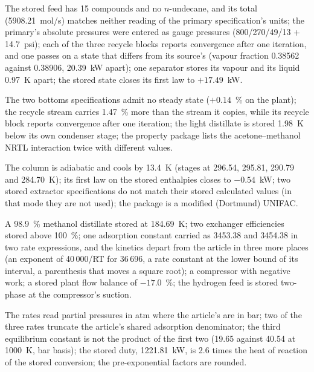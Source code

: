 \documentclass[11pt]{article}
\begin{document}
\begin{description}[leftmargin=1em]
\item[A (Cavett's problem)] The stored feed has 15 compounds and no
  $n$-undecane, and its total (5908.21~mol/s) matches neither reading of the
  primary specification's units; the primary's absolute pressures were
  entered as gauge pressures (800/270/49/13 + 14.7~psi); each of the three
  recycle blocks reports convergence after one iteration, and one passes on
  a state that differs from its source's (vapour fraction 0.38562 against
  0.38906, 20.39~kW apart); one separator stores its vapour and its liquid
  0.97~K apart; the stored state closes its first law to $+17.49$~kW.
\item[B (pressure-swing distillation)] The two bottoms specifications admit
  no steady state ($+0.14$~\% on the plant); the recycle stream carries
  1.47~\% more than the stream it copies, while its recycle block reports
  convergence after one iteration; the light distillate is stored 1.98~K
  below its own condenser stage; the property package lists the
  acetone--methanol NRTL interaction twice with different values.
\item[C (extraction with MIBK)] The column is adiabatic and cools by
  13.4~K (stages at 296.54, 295.81, 290.79 and 284.70~K); its first law on
  the stored enthalpies closes to $-0.54$~kW; two stored extractor
  specifications do not match their stored calculated values (in that mode
  they are not used); the package is a modified (Dortmund) UNIFAC.
\item[D (methanol from CO$_2$)] A 98.9~\% methanol distillate stored at
  184.69~K; two exchanger efficiencies stored above 100~\%; one adsorption
  constant carried as 3453.38 and 3454.38 in two rate expressions, and the
  kinetics depart from the article in three more places (an exponent of
  40\,000/RT for 36\,696, a rate constant at the lower bound of its
  interval, a parenthesis that moves a square root); a compressor with
  negative work; a stored plant flow balance of $-17.0$~\%; the hydrogen
  feed is stored two-phase at the compressor's suction.
\item[E (steam reforming)] The rates read partial pressures in atm where
  the article's are in bar; two of the three rates truncate the article's
  shared adsorption denominator; the third equilibrium constant is not the
  product of the first two (19.65 against 40.54 at 1000~K, bar basis); the
  stored duty, 1221.81~kW, is 2.6 times the heat of reaction of the stored
  conversion; the pre-exponential factors are rounded.
\end{description}
\end{document}
